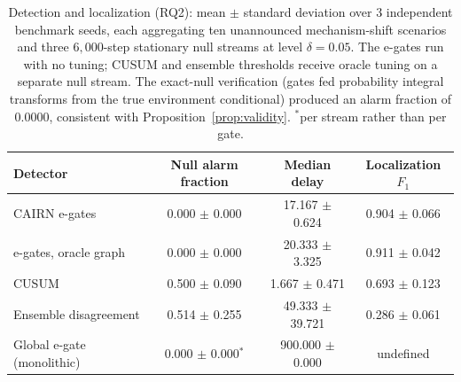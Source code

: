\begin{table}[t]
\caption{Detection and localization (RQ2): mean $\pm$ standard deviation
over 3 independent benchmark seeds, each aggregating
ten unannounced mechanism-shift scenarios and three $6{,}000$-step
stationary null streams at level $\delta=0.05$. The e-gates run with no tuning; CUSUM and ensemble
thresholds receive oracle tuning on a separate null stream. The exact-null
verification (gates fed probability integral transforms from the true
environment conditional) produced an alarm fraction of
$0.0000$, consistent with
Proposition~\ref{prop:validity}. $^{\ast}$per stream rather than per gate.}
\label{tab:rq2}
\footnotesize\setlength{\tabcolsep}{3.5pt}%
\begin{tabular}{lccc}
\toprule
Detector & Null alarm fraction & Median delay & Localization $F_1$\\
\midrule
CAIRN e-gates & 0.000 $\pm$ 0.000 & 17.167 $\pm$ 0.624 & 0.904 $\pm$ 0.066 \\
e-gates, oracle graph & 0.000 $\pm$ 0.000 & 20.333 $\pm$ 3.325 & 0.911 $\pm$ 0.042 \\
CUSUM & 0.500 $\pm$ 0.090 & 1.667 $\pm$ 0.471 & 0.693 $\pm$ 0.123 \\
Ensemble disagreement & 0.514 $\pm$ 0.255 & 49.333 $\pm$ 39.721 & 0.286 $\pm$ 0.061 \\
Global e-gate (monolithic) & 0.000 $\pm$ 0.000$^{\ast}$ & 900.000 $\pm$ 0.000 & undefined \\
\bottomrule
\end{tabular}
\end{table}
